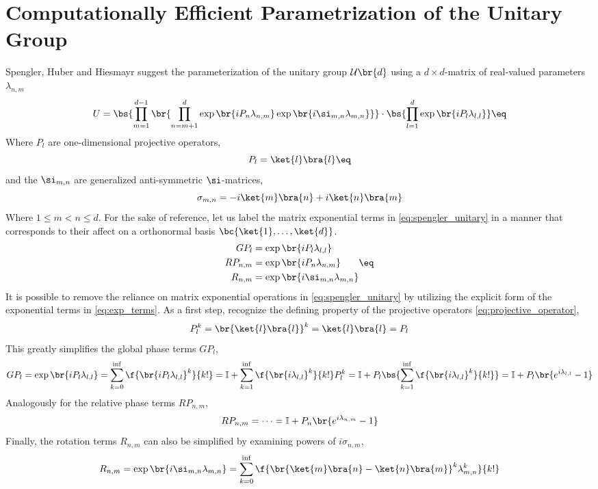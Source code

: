 \documentclass[aps, 10pt, english, twoside, pra, nofootinbib, longbibliography]{revtex4-1}
\theoremstyle{plain}
\theoremstyle{definition}
\theoremstyle{remark}
\begin{document}
    \section{Computationally Efficient Parametrization of the Unitary Group}
    Spengler, Huber and Hiesmayr \cite{Spengler_2010_Unitary} suggest the parameterization of the unitary group $\mathcal{U}\br{d}$ using a $d\times d$-matrix of real-valued parameters $\lambda_{n, m}$
    \[ U = \bs{\prod_{m=1}^{d-1} \br{\prod_{n=m+1}^{d} \exp\br{i P_n \lambda_{n,m}}\exp\br{i \si_{m,n} \lambda_{m,n}}}} \cdot \bs{\prod_{l=1}^{d} \exp\br{iP_l \lambda_{l,l}}}  \eq \label{eq:spengler_unitary} \]
    Where $P_l$ are one-dimensional projective operators,
    \[ P_l = \ket{l}\bra{l} \eq \label{eq:projective_operator} \]
    and the $\si_{m,n}$ are generalized anti-symmetric $\si$-matrices,
    \[ \sigma_{m,n} = -i \ket{m}\bra{n} +i \ket{n}\bra{m} \]
    Where $1 \leq m < n \leq d$.
    For the sake of reference, let us label the matrix exponential terms in \cref{eq:spengler_unitary} in a manner that corresponds to their affect on a orthonormal basis $\bc{\ket{1}, \ldots, \ket{d}}$.
    \begin{align}
    \begin{split}
        GP_l &= \exp\br{iP_l \lambda_{l,l}} \\
        RP_{n,m} &= \exp\br{i P_n \lambda_{n,m}} \\
        R_{n,m} &= \exp\br{i \si_{m,n} \lambda_{m,n}}
    \end{split} \eq \label{eq:exp_terms}
    \end{align}
    It is possible to remove the reliance on matrix exponential operations in \cref{eq:spengler_unitary} by utilizing the explicit form of the exponential terms in \cref{eq:exp_terms}. As a first step, recognize the defining property of the projective operators \cref{eq:projective_operator},
    \[ P_l^k = \br{\ket{l}\bra{l}}^k = \ket{l}\bra{l} = P_l \]
    This greatly simplifies the global phase terms $GP_l$,
    \[ GP_l = \exp\br{iP_l \lambda_{l,l}} = \sum_{k=0}^{\inf} \f{\br{iP_l \lambda_{l,l}}^k}{k!} = \mathbb{I} + \sum_{k=1}^{\inf} \f{\br{i \lambda_{l,l}}^k}{k!}P_l^k = \mathbb{I} + P_l \bs{\sum_{k=1}^{\inf} \f{\br{i \lambda_{l,l}}^k}{k!}} = \mathbb{I} + P_l \br{e^{i \lambda_{l,l}} - 1} \]
    Analogously for the relative phase terms $RP_{n,m}$,
    \[ RP_{n,m} = \cdots = \mathbb{I} + P_n \br{e^{i \lambda_{n,m}} - 1} \]
    Finally, the rotation terms $R_{n,m}$ can also be simplified by examining powers of $i \sigma_{n,m}$,
    \[ R_{n,m} = \exp\br{i \si_{m,n} \lambda_{m,n}} = \sum_{k=0}^{\inf} \f{\br{\ket{m}\bra{n} - \ket{n}\bra{m}}^k \lambda_{m,n}^k}{k!} \]
\end{document}
